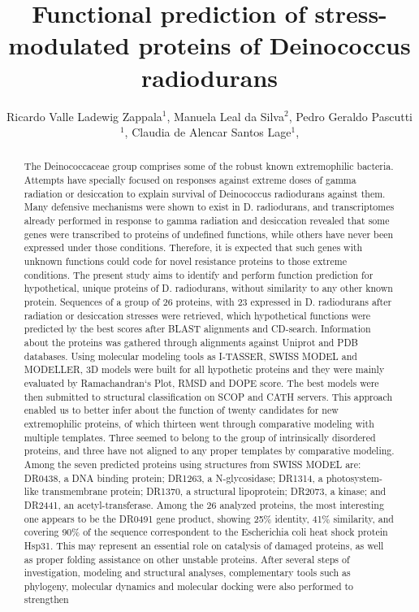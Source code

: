 \documentclass[twoside]{article}
\title{\vspace{-15mm}\fontsize{24pt}{10pt}\selectfont\textbf{ Functional prediction of stress-modulated proteins of Deinococcus radiodurans }} %
\author{ Ricardo Valle Ladewig Zappala$^{1}$, Manuela Leal da Silva$^{2}$, Pedro Geraldo Pascutti$^{1}$, Claudia de Alencar Santos Lage$^{1}$, }
\affil{ 1 Universidade Federal do Rio de Janeiro

2 Instituto Nacional de Metrologia, Qualidade e Tecnologia

 }
\date{}
\begin{document}
  
  
  \maketitle %
  
  
  \thispagestyle{fancy} %
  
  
  \begin{abstract}
  The Deinococcaceae group comprises some of the robust known extremophilic bacteria. Attempts have specially focused on responses against extreme doses of gamma radiation or desiccation to explain survival of Deinococcus radiodurans against them. Many defensive mechanisms were shown to exist in D. radiodurans, and transcriptomes already performed in response to gamma radiation and desiccation revealed that some genes were transcribed to proteins of undefined functions, while others have never been expressed under those conditions. Therefore, it is expected that such genes with unknown functions could code for novel resistance proteins to those extreme conditions. The present study aims to identify and perform function prediction for hypothetical, unique proteins of D. radiodurans, without similarity to any other known protein. Sequences of a group of 26 proteins, with 23 expressed in D. radiodurans after radiation or desiccation stresses were retrieved, which hypothetical functions were predicted by the best scores after BLAST alignments and CD-search. Information about the proteins was gathered through alignments against Uniprot and PDB databases. Using molecular modeling tools as I-TASSER, SWISS MODEL and MODELLER, 3D models were built for all hypothetic proteins and they were mainly evaluated by Ramachandran‘s Plot, RMSD and DOPE score. The best models were then submitted to structural classification on SCOP and CATH servers. This approach enabled us to better infer about the function of twenty candidates for new extremophilic proteins, of which thirteen went through comparative modeling with multiple templates. Three seemed to belong to the group of intrinsically disordered proteins, and three have not aligned to any proper templates by comparative modeling. Among the seven predicted proteins using structures from SWISS MODEL are: DR0438, a DNA binding protein; DR1263, a N-glycosidase; DR1314, a photosystem-like transmembrane protein; DR1370, a structural lipoprotein; DR2073, a kinase; and DR2441, an acetyl-transferase. Among the 26 analyzed proteins, the most interesting one appears to be the DR0491 gene product, showing 25\% identity, 41\% similarity, and covering 90\% of the sequence correspondent to the Escherichia coli heat shock protein Hsp31. This may represent an essential role on catalysis of damaged proteins, as well as proper folding assistance on other unstable proteins. After several steps of investigation, modeling and structural analyses, complementary tools such as phylogeny, molecular dynamics and molecular docking were also performed to strengthen 
\end{abstract}
\end{document}
